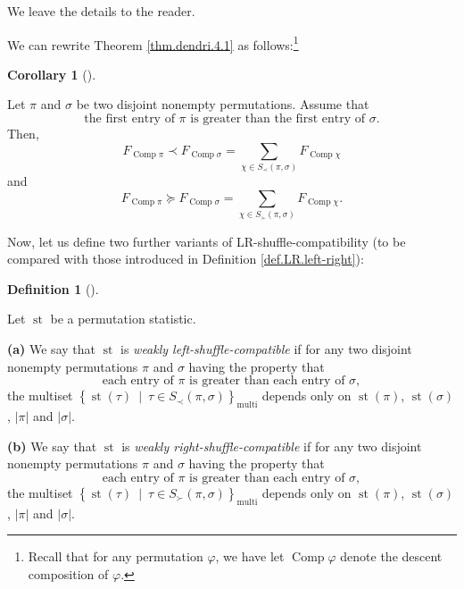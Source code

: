 \documentclass[numbers=enddot,12pt,final,onecolumn,notitlepage]{scrartcl}%
\theoremstyle{definition}
\newtheorem{defi}[theo]{Definition}
\newenvironment{definition}[1][]
{\begin{defi}[#1]\begin{leftbar}}
{\end{leftbar}\end{defi}}
\newtheorem{coro}[theo]{Corollary}
\newenvironment{corollary}[1][]
{\begin{coro}[#1]\begin{leftbar}}
{\end{leftbar}\end{coro}}
\let\sumnonlimits\sum
\renewcommand{\sum}{\sumnonlimits\limits}
\begin{document}
We leave the details to the reader.

We can rewrite Theorem \ref{thm.dendri.4.1} as follows:\footnote{Recall that
for any permutation $\varphi$, we have let $\operatorname*{Comp}\varphi$
denote the descent composition of $\varphi$.}

\begin{corollary}
\label{cor.dendri.4.1}Let $\pi$ and $\sigma$ be two disjoint nonempty
permutations. Assume that%
\[
\text{the first entry of }\pi\text{ is greater than the first entry of }%
\sigma\text{.}%
\]
Then,%
\[
F_{\operatorname*{Comp}\pi}\left.  \prec\right.  F_{\operatorname*{Comp}%
\sigma}=\sum_{\chi\in S_{\prec}\left(  \pi,\sigma\right)  }%
F_{\operatorname*{Comp}\chi}%
\]
and%
\[
F_{\operatorname*{Comp}\pi}\left.  \succeq\right.  F_{\operatorname*{Comp}%
\sigma}=\sum_{\chi\in S_{\succ}\left(  \pi,\sigma\right)  }%
F_{\operatorname*{Comp}\chi}.
\]

\end{corollary}

Now, let us define two further variants of LR-shuffle-compatibility (to be
compared with those introduced in Definition \ref{def.LR.left-right}):

\begin{definition}
Let $\operatorname*{st}$ be a permutation statistic.

\textbf{(a)} We say that $\operatorname*{st}$ is \textit{weakly
left-shuffle-compatible} if for any two disjoint nonempty permutations $\pi$
and $\sigma$ having the property that%
\begin{equation}
\text{each entry of }\pi\text{ is greater than each entry of }\sigma,
\label{eq.def.dendri.dsc.weak-ass}%
\end{equation}
the multiset $\left\{  \operatorname*{st}\left(  \tau\right)  \ \mid\ \tau\in
S_{\prec}\left(  \pi,\sigma\right)  \right\}  _{\operatorname*{multi}}$
depends only on $\operatorname*{st}\left(  \pi\right)  $, $\operatorname*{st}%
\left(  \sigma\right)  $, $\left\vert \pi\right\vert $ and $\left\vert
\sigma\right\vert $.

\textbf{(b)} We say that $\operatorname*{st}$ is \textit{weakly
right-shuffle-compatible} if for any two disjoint nonempty permutations $\pi$
and $\sigma$ having the property that%
\[
\text{each entry of }\pi\text{ is greater than each entry of }\sigma,
\]
the multiset $\left\{  \operatorname*{st}\left(  \tau\right)  \ \mid\ \tau\in
S_{\succ}\left(  \pi,\sigma\right)  \right\}  _{\operatorname*{multi}}$
depends only on $\operatorname*{st}\left(  \pi\right)  $, $\operatorname*{st}%
\left(  \sigma\right)  $, $\left\vert \pi\right\vert $ and $\left\vert
\sigma\right\vert $.
\end{definition}
\end{document}
